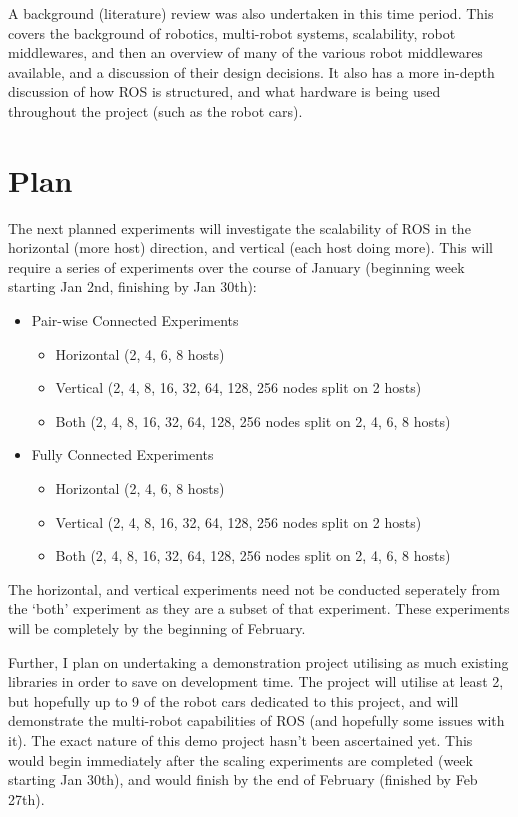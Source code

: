 \documentclass[11pt]{article}
\begin{document}
A background (literature) review was also undertaken in this time period. This covers the background of robotics, multi-robot systems, scalability, robot middlewares, and then an overview of many of the various robot middlewares available, and a discussion of their design decisions. It also has a more in-depth discussion of how ROS is structured, and what hardware is being used throughout the project (such as the robot cars).

\section{Plan}

The next planned experiments will investigate the scalability of ROS in the horizontal (more host) direction, and vertical (each host doing more). This will require a series of experiments over the course of January (beginning week starting Jan 2nd, finishing by Jan 30th):

\begin{itemize}
    \item Pair-wise Connected Experiments
        \begin{itemize}
            \item Horizontal (2, 4, 6, 8 hosts)
            \item Vertical (2, 4, 8, 16, 32, 64, 128, 256 nodes split on 2 hosts)
            \item Both (2, 4, 8, 16, 32, 64, 128, 256 nodes split on 2, 4, 6, 8 hosts)
        \end{itemize}
    \item Fully Connected Experiments
        \begin{itemize}
            \item Horizontal (2, 4, 6, 8 hosts)
            \item Vertical (2, 4, 8, 16, 32, 64, 128, 256 nodes split on 2 hosts)
            \item Both (2, 4, 8, 16, 32, 64, 128, 256 nodes split on 2, 4, 6, 8 hosts)
        \end{itemize}
\end{itemize}

The horizontal, and vertical experiments need not be conducted seperately from the `both' experiment as they are a subset of that experiment. These experiments will be completely by the beginning of February.

Further, I plan on undertaking a demonstration project utilising as much existing libraries in order to save on development time. The project will utilise at least 2, but hopefully up to 9 of the robot cars dedicated to this project, and will demonstrate the multi-robot capabilities of ROS (and hopefully some issues with it). The exact nature of this demo project hasn't been ascertained yet. This would begin immediately after the scaling experiments are completed (week starting Jan 30th), and would finish by the end of February (finished by Feb 27th).
\end{document}
